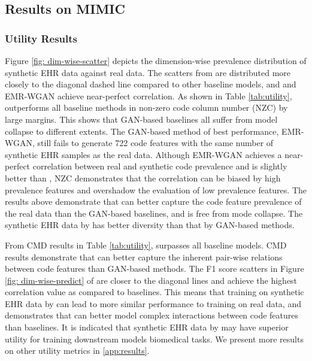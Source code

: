 \subsection{Results on MIMIC}

\subsubsection{Utility Results}

Figure \ref{fig: dim-wise-scatter} depicts the dimension-wise prevalence distribution of synthetic EHR data against real data. The scatters from \modelname are distributed more closely to the diagonal dashed line compared to other baseline models, and \modelname and EMR-WGAN achieve near-perfect correlation. 
As shown in Table \ref{tab:utility}, \modelname outperforms all baseline methods in non-zero code column number (NZC) by large margins. This shows that GAN-based baselines all suffer from model collapse to different extents. The GAN-based method of best performance, EMR-WGAN, still fails to generate 722 code features with the same number of synthetic EHR samples as the real data. 
Although EMR-WGAN achieves a near-perfect correlation between real and synthetic code prevalence and is slightly better than \modelname, NZC demonstrates that the correlation can be biased by high prevalence features and overshadow the evaluation of low prevalence features. 
The results above demonstrate that \modelname can better capture the code feature prevalence of the real data than the GAN-based baselines, and is free from mode collapse. The synthetic EHR data by \modelname has better diversity than that by GAN-based methods.

From CMD results in Table \ref{tab:utility}, \modelname surpasses all baseline models. 
CMD results demonstrate that \modelname can better capture the inherent pair-wise relations between code features than GAN-based methods. 
The F1 score scatters in Figure \ref{fig: dim-wise-predict} of \modelname are closer to the diagonal lines and achieve the highest correlation value as compared to baselines. This means that training on synthetic EHR data by \modelname can lead to more similar performance to training on real data, and demonstrates that \modelname can better model complex interactions between code features than baselines.
It is indicated that synthetic EHR data by \modelname may have superior utility for training downstream models biomedical tasks.
We present more results on other utility metrics in \ref{app:results}.

